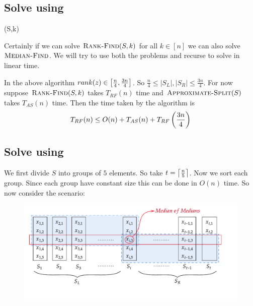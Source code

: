 \subsection{Solve  using }
\begin{algorithm}
	\DontPrintSemicolon
\caption{(S,k)}
\end{algorithm}
\parinn

Certainly if we can solve $\textsc{Rank-Find}(S,k)$ for all $k\in[n]$ we can also solve $\textsc{Median-Find}$. We will try to use both the problems and recurse to solve  in linear time. 

In the above algorithm $rank(z)\in \left[\frac{n}{4},\frac{3n}{4}\right]$. So $\frac{n}4\leq |S_L|,|S_R|\leq \frac{3n}4$. For now suppose $\textsc{Rank-Find}(S,k)$ takes $T_{RF}(n)$ time and $\textsc{Approximate-Split}(S)$ takes $T_{AS}(n)$ time. Then the time taken by the algorithm is  $$T_{RF}(n)\leq O(n)+T_{AS}(n)+T_{RF}\left(\frac{3n}4\right)$$
\subsection{Solve  using }
We first divide $S$ into groups of $5$ elements. So take $t=\left\lceil\frac{n}5\right\rceil$. Now we sort each group. Since each group have constant size this can be done in $O(n)$ time. So now consider the scenario:
\begin{figure}[h]
	\centering
	\includegraphics{images/approx-split-using-rankfind}
\end{figure}